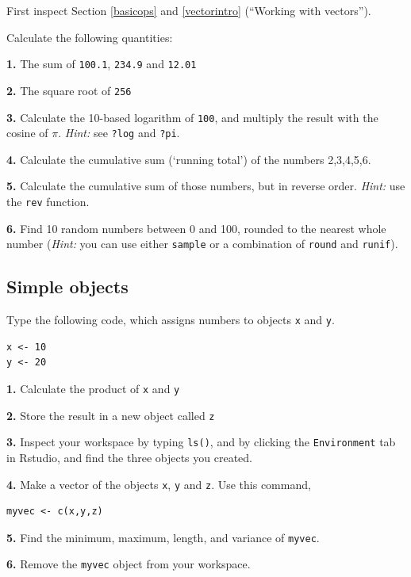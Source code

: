 \documentclass[]{book}
\begin{document}
First inspect Section \ref{basicops} and \ref{vectorintro} (``Working with vectors'').

Calculate the following quantities:

\textbf{1.} The sum of \texttt{100.1}, \texttt{234.9} and \texttt{12.01}

\textbf{2.} The square root of \texttt{256}

\textbf{3.} Calculate the 10-based logarithm of \texttt{100}, and multiply the result with the cosine of \(\pi\). \emph{Hint:} see \texttt{?log} and \texttt{?pi}.

\textbf{4.} Calculate the cumulative sum (`running total') of the numbers 2,3,4,5,6.

\textbf{5.} Calculate the cumulative sum of those numbers, but in reverse order. \emph{Hint:} use the \texttt{rev} function.

\textbf{6.} Find 10 random numbers between 0 and 100, rounded to the nearest whole number (\emph{Hint:} you can use either \texttt{sample} or a combination of \texttt{round} and \texttt{runif}).

\hypertarget{simple-objects}{%
\subsection{Simple objects}\label{simple-objects}}

Type the following code, which assigns numbers to objects \texttt{x} and \texttt{y}.

\begin{verbatim}
x <- 10
y <- 20
\end{verbatim}

\textbf{1.} Calculate the product of \texttt{x} and \texttt{y}

\textbf{2.} Store the result in a new object called \texttt{z}

\textbf{3.} Inspect your workspace by typing \texttt{ls()}, and by clicking the \texttt{Environment} tab in Rstudio, and find the three objects you created.

\textbf{4.} Make a vector of the objects \texttt{x}, \texttt{y} and \texttt{z}. Use this command,

\begin{verbatim}
myvec <- c(x,y,z)
\end{verbatim}

\textbf{5.} Find the minimum, maximum, length, and variance of \texttt{myvec}.

\textbf{6.} Remove the \texttt{myvec} object from your workspace.
\end{document}
